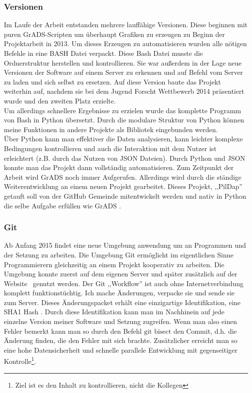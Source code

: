 \subsubsection{Versionen}
Im Laufe der Arbeit entstanden mehrere lauffähige Versionen.
Diese beginnen mit puren GrADS-Scripten um überhaupt Grafiken
zu erzeugen zu Beginn der Projektarbeit in 2013.
Um dieses Erzeugen zu automatisieren wurden alle nötigen Befehle in eine BASH Datei verpackt.
Diese Bash Datei musste die Ordnerstruktur herstellen und kontrollieren.
Sie war außerdem in der Lage neue Versionen der Software auf einem Server zu erkennen
und auf Befehl vom Server zu laden und sich selbst zu ersetzen.
Auf diese Version baute das Projekt weiterhin auf,
nachdem sie bei dem Jugend Forscht Wettbewerb 2014
präsentiert wurde und den zweiten Platz erzielte.\\
Um allerdings schnellere Ergebnisse zu erzielen wurde
das komplette Programm von Bash in Python übersetzt.
Durch die modulare Struktur von Python können meine
Funktionen in andere Projekte als Bibliotek eingebunden werden.\\
Über Python kann man effektiver die Daten analysieren,
kann leichter komplexe Bedingungen kontrollieren und
auch die Interaktion mit dem Nutzer ist erleichtert
(z.B. durch das Nutzen von JSON Dateien).
Durch Python und JSON konnte man das Projekt dann vollständig automatisieren.
Zum Zeitpunkt der Arbeit wird GrADS noch immer Aufgerufen. Allerdings
wird durch die ständige Weiterentwicklung an einem neuen Projekt gearbeitet.
Dieses Projekt, ,,PilDap'' getauft soll von der GitHub Gemeinde mitentwickelt
werden und nativ in Python die selbe Aufgabe erfüllen wie GrADS \cite{pildap}.

\subsubsection*{Git}
Ab Anfang 2015 findet eine neue Umgebung anwendung um an
Programmen und der Setzung zu arbeiten.
Die Umgebung Git \cite{gitrepo}
ermöglicht im eigentlichen Sinne Programmierern gleichzeitig an
einem Projekt kooperativ zu arbeiten.
Die Umgebung konnte zuerst auf dem eigenen Server und später zusätzlich
auf der Website  \cite{github} genutzt werden.
Der Git ,,Workflow'' ist auch ohne Internetverbindung komplett funktionstüchtig.
Ich mache Änderungen, verpacke sie und sende sie zum Server.
Dieses Änderungspacket erhält eine einzigartige Identifikation, eine SHA1 Hash \cite{gitsha1}.
Durch diese Identifikation kann man im Nachhinein auf jede einzelne Version
meiner Software und Setzung zugreifen. Wenn man also einen Fehler bemerkt kann man so
durch den Befehl $\text{git bisect}$ den Commit, d.h. die Änderung finden, die den Fehler
mit sich brachte.
Zusätzlicher erreicht man so eine hohe Datensicherheit \cite{linussaves} und schnelle parallele Entwicklung mit gegenseitiger Kontrolle\footnote{Ziel ist es den Inhalt zu kontrollieren, nicht die Kollegen}.

